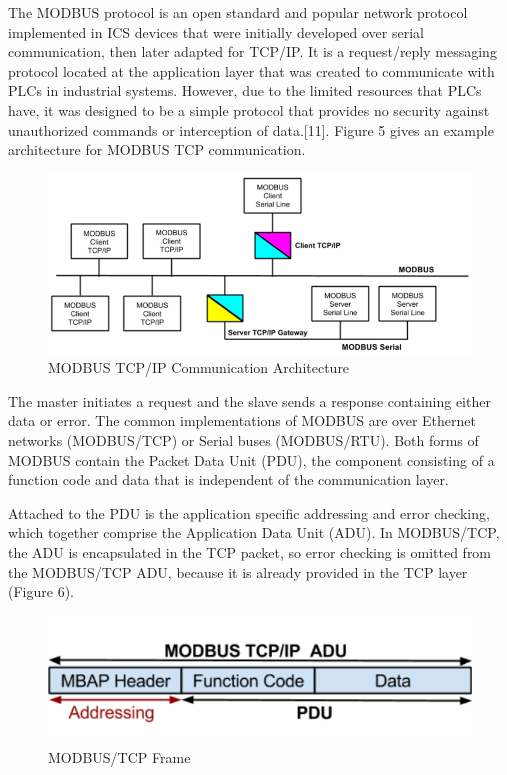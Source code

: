 \documentclass[11pt,]{article}
\begin{document}
The MODBUS protocol is an open standard and popular network protocol
implemented in ICS devices that were initially developed over serial
communication, then later adapted for TCP/IP. It is a request/reply
messaging protocol located at the application layer that was created to
communicate with PLCs in industrial systems. However, due to the limited
resources that PLCs have, it was designed to be a simple protocol that
provides no security against unauthorized commands or interception of
data.{[}11{]}. Figure 5 gives an example architecture for MODBUS TCP
communication.

\begin{figure}[h]

{\centering \includegraphics{thesis_files/figure-latex/unnamed-chunk-8-1} 

}

\caption{MODBUS TCP/IP Communication Architecture}\label{fig:unnamed-chunk-8}
\end{figure}

The master initiates a request and the slave sends a response containing
either data or error. The common implementations of MODBUS are over
Ethernet networks (MODBUS/TCP) or Serial buses (MODBUS/RTU). Both forms
of MODBUS contain the Packet Data Unit (PDU), the component consisting
of a function code and data that is independent of the communication
layer.

Attached to the PDU is the application specific addressing and error
checking, which together comprise the Application Data Unit (ADU). In
MODBUS/TCP, the ADU is encapsulated in the TCP packet, so error checking
is omitted from the MODBUS/TCP ADU, because it is already provided in
the TCP layer (Figure 6).

\begin{figure}[h]

{\centering \includegraphics{thesis_files/figure-latex/unnamed-chunk-9-1} 

}

\caption{MODBUS/TCP Frame}\label{fig:unnamed-chunk-9}
\end{figure}
\end{document}
